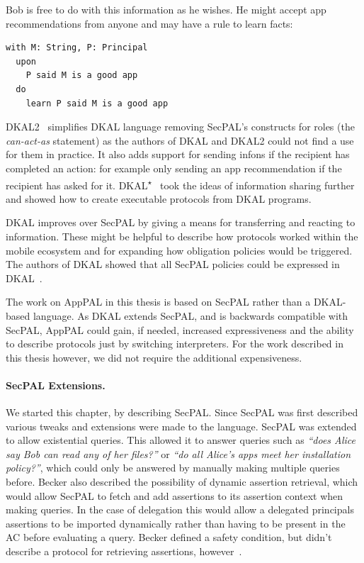 \documentclass[thesis.tex]{subfiles}
\begin{document}
Bob is free to do with this information as he wishes. He might accept
app recommendations from anyone and may have a rule to learn facts:

\noindent\begin{minipage}{\textwidth}
\begin{lstlisting}
with M: String, P: Principal
  upon
    P said M is a good app
  do
    learn P said M is a good app
\end{lstlisting}
\end{minipage}

DKAL2~\cite{yuri_gurevich_dkal2---simplified_2009} simplifies DKAL
language removing SecPAL's constructs for roles (the \emph{can-act-as} statement)
as the authors of DKAL and DKAL2 could not find a use for them in practice.  It also adds
support for sending infons if the recipient has completed an action:
for example only sending an app recommendation if the recipient has
asked for it.
DKAL\textsuperscript{$\star$}~\cite{jeannin_dkal*:_2013} took the ideas of information sharing
further and showed how to create executable protocols from DKAL programs.

DKAL improves over SecPAL by giving a means for transferring and
reacting to information. These might be helpful to describe how
protocols worked within the mobile ecosystem and for expanding how
obligation policies would be triggered.  The authors of DKAL showed
that all SecPAL policies could be expressed in
DKAL~\cite{gurevich_dkal:_2008}. 

The work on AppPAL in this thesis is based on SecPAL rather than a DKAL-based language. 
As DKAL extends SecPAL, and is backwards compatible with SecPAL, AppPAL could gain, if needed,
increased expressiveness and the ability to describe protocols just by switching interpreters.
For the work described in this thesis however, we did not require the additional expensiveness.

\paragraph*{SecPAL Extensions.}
We started this chapter, by describing SecPAL. Since SecPAL was first described
various tweaks and extensions were made to the language. SecPAL was extended to
allow existential queries. This allowed it to answer
queries such as \emph{``does Alice say Bob can read any of her files?''} or
\emph{``do all Alice's apps meet her installation policy?''}, which could only
be answered by manually making multiple queries before. 
%
Becker also described the possibility of dynamic assertion retrieval, which
would allow SecPAL to fetch and add assertions to its assertion context when
making queries. In the case of delegation this would allow a delegated
principals assertions to be imported dynamically rather than having to be
present in the AC before evaluating a query. Becker defined a safety condition,
but didn't describe a protocol for retrieving assertions,
however~\cite{moritz_y_becker_secpal:_2009}.
\end{document}
